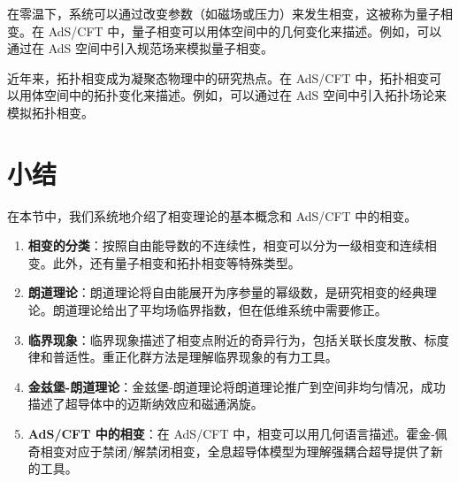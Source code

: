 \begin{example}[量子相变]
在零温下，系统可以通过改变参数（如磁场或压力）来发生相变，这被称为量子相变。在 AdS/CFT 中，量子相变可以用体空间中的几何变化来描述。例如，可以通过在 AdS 空间中引入规范场来模拟量子相变。
\end{example}

\begin{example}[拓扑相变]
近年来，拓扑相变成为凝聚态物理中的研究热点。在 AdS/CFT 中，拓扑相变可以用体空间中的拓扑变化来描述。例如，可以通过在 AdS 空间中引入拓扑场论来模拟拓扑相变。
\end{example}

\section{小结}

\begin{note}
在本节中，我们系统地介绍了相变理论的基本概念和 AdS/CFT 中的相变。
\end{note}

\begin{enumerate}
    \item \textbf{相变的分类}：按照自由能导数的不连续性，相变可以分为一级相变和连续相变。此外，还有量子相变和拓扑相变等特殊类型。
    \item \textbf{朗道理论}：朗道理论将自由能展开为序参量的幂级数，是研究相变的经典理论。朗道理论给出了平均场临界指数，但在低维系统中需要修正。
    \item \textbf{临界现象}：临界现象描述了相变点附近的奇异行为，包括关联长度发散、标度律和普适性。重正化群方法是理解临界现象的有力工具。
    \item \textbf{金兹堡-朗道理论}：金兹堡-朗道理论将朗道理论推广到空间非均匀情况，成功描述了超导体中的迈斯纳效应和磁通涡旋。
    \item \textbf{AdS/CFT 中的相变}：在 AdS/CFT 中，相变可以用几何语言描述。霍金-佩奇相变对应于禁闭/解禁闭相变，全息超导体模型为理解强耦合超导提供了新的工具。
\end{enumerate}

